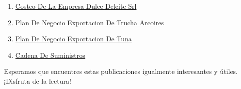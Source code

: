 \documentclass[
  stu,
  floatsintext,
  longtable,
  a4paper,
  nolmodern,
  notxfonts,
  notimes,
  12pt,
  colorlinks=true,linkcolor=blue,citecolor=blue,urlcolor=blue]{apa7}
\providecommand{\tightlist}{%
  \setlength{\itemsep}{0pt}\setlength{\parskip}{0pt}}
\begin{document}
\begin{enumerate}
\def\labelenumi{\arabic{enumi}.}
\tightlist
\item
  \href{https://actus-mercator.netlify.app/posts/2017-10-23-costeo-de-la-empresa-dulce-deleite-srl/index.pdf}{}
  \href{https://actus-mercator.netlify.app/posts/2017-10-23-costeo-de-la-empresa-dulce-deleite-srl}{Costeo
  De La Empresa Dulce Deleite Srl}
\item
  \href{https://actus-mercator.netlify.app/posts/2020-09-15-plan-de-negocio-exportacion-de-trucha-arcoires/index.pdf}{}
  \href{https://actus-mercator.netlify.app/posts/2020-09-15-plan-de-negocio-exportacion-de-trucha-arcoires}{Plan
  De Negocio Exportacion De Trucha Arcoires}
\item
  \href{https://actus-mercator.netlify.app/posts/2021-07-13-plan-de-negocio-exportacion-de-tuna/index.pdf}{}
  \href{https://actus-mercator.netlify.app/posts/2021-07-13-plan-de-negocio-exportacion-de-tuna}{Plan
  De Negocio Exportacion De Tuna}
\item
  \href{https://actus-mercator.netlify.app/posts/2022-01-23-cadena-de-suministros/index.pdf}{}
  \href{https://actus-mercator.netlify.app/posts/2022-01-23-cadena-de-suministros}{Cadena
  De Suministros}
\end{enumerate}

Esperamos que encuentres estas publicaciones igualmente interesantes y
útiles. ¡Disfruta de la lectura!
\end{document}
